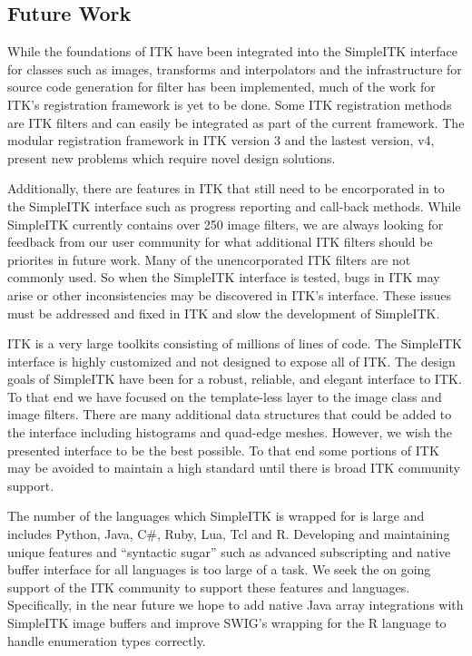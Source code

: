 \documentclass{frontiersMED} %
\begin{document}
\subsection{Future Work}
While the foundations of ITK have been integrated into the SimpleITK
interface for classes such as images, transforms and interpolators and the
infrastructure for source code generation for filter has been
implemented, much of the work for ITK's registration framework is yet
to be done. Some ITK registration methods are ITK filters and can easily
be integrated as part of the current framework. The modular
registration framework in ITK version 3 and the lastest version, v4,
present new problems which require novel design solutions.

Additionally, there are features in ITK that still need to be encorporated
in to the SimpleITK interface such as progress reporting and call-back
methods. While SimpleITK currently contains over 250 image filters,
we are always looking for feedback from our user community for
what additional ITK filters should be priorites in future
work. Many of the unencorporated ITK filters are not commonly used. So when the
SimpleITK interface is tested, bugs in ITK may arise or other
inconsistencies may be discovered in ITK's interface. These issues must be
addressed and fixed in ITK and slow the development of SimpleITK.

ITK is a very large toolkits consisting of millions of lines of
code. The SimpleITK interface is highly customized and not designed to
expose all of ITK. The design goals of SimpleITK have been
for a robust, reliable, and elegant interface to ITK. To that end we
have focused on the template-less layer to the image class and image
filters.  There are many additional data structures that could be
added to the interface including histograms and quad-edge
meshes. However, we wish the presented interface to be the best
possible. To that end some portions of ITK may be avoided to
maintain a high standard until there is broad ITK community support.

The number of the languages which SimpleITK is wrapped for is large
and includes Python, Java, C\#, Ruby, Lua, Tcl and R. Developing and
maintaining unique features and ``syntactic sugar'' such as advanced
subscripting and native buffer interface for all languages is too
large of a task. We seek the on going support of the ITK community to
support these features and languages. Specifically, in the near future
we hope to add native Java array integrations with SimpleITK image
buffers and improve SWIG's wrapping for the R language to handle
enumeration types correctly.
\end{document}
